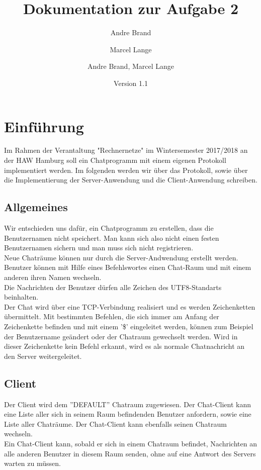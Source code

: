 \documentclass[a4paper, oneside]{scrreprt}
\author{Andre Brand}
\author{Marcel Lange}
\begin{document}
    \title{Dokumentation zur Aufgabe 2}
	\author{Andre Brand, Marcel Lange}
    \date{Version 1.1}
    \subject{Praktikum Rechnernetze}
    \maketitle

	\renewcommand{\contentsname}{Inhaltsverzeichnis}
    \tableofcontents

\chapter{Einführung}
Im Rahmen der Verantaltung "Rechnernetze" im Wintersemester 2017/2018 an der HAW Hamburg soll ein Chatprogramm mit einem eigenen Protokoll implementiert werden.
Im folgenden werden wir über das Protokoll, sowie über die Implementierung der Server-Anwendung und die Client-Anwendung schreiben. 

\section{Allgemeines}
Wir entschieden uns dafür, ein Chatprogramm zu erstellen, dass die Benutzernamen nicht speichert. Man kann sich also nicht einen festen Benutzernamen sichern und man muss sich nicht registrieren.
\\Neue Chaträume können nur durch die Server-Andwendung erstellt werden. Benutzer können mit Hilfe eines Befehlswortes einen Chat-Raum und mit einem anderen ihren Namen wechseln.  
\\Die Nachrichten der Benutzer dürfen alle Zeichen des UTF8-Standarts beinhalten.
\\Der Chat wird über eine TCP-Verbindung realisiert und es werden Zeichenketten übermittelt. Mit bestimmten Befehlen, die sich immer am Anfang der Zeichenkette befinden und mit einem '\$' eingeleitet werden, können zum Beispiel der Benutzername geändert oder der Chatraum gewechselt werden. Wird in dieser Zeichenkette kein Befehl erkannt, wird es als normale Chatnachricht an den Server weitergeleitet.

\section{Client}
Der Client wird dem ''DEFAULT'' Chatraum zugewiesen. Der Chat-Client kann eine Liste aller
sich in seinem Raum befindenden Benutzer anfordern, sowie eine Liste aller Chaträume. Der
Chat-Client kann ebenfalls seinen Chatraum wechseln.
\\Ein Chat-Client kann, sobald er sich in einem Chatraum befindet, Nachrichten an alle anderen
Benutzer in diesem Raum senden, ohne auf eine Antwort des Servers warten zu müssen.
\newpage
\end{document}
